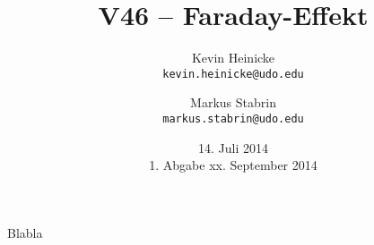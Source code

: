 


\title{%
    V46 -- Faraday-Effekt
}
\author{%
    Kevin Heinicke\\
    \texttt{kevin.heinicke@udo.edu}
    \and
    Markus Stabrin\\
    \texttt{markus.stabrin@udo.edu}
}
\date{%
    14. Juli 2014\\
    {\small 1. Abgabe} xx. September 2014
}

    \maketitle%
    \tableofcontents
    \newpage

    Blabla

    \printbibliography

